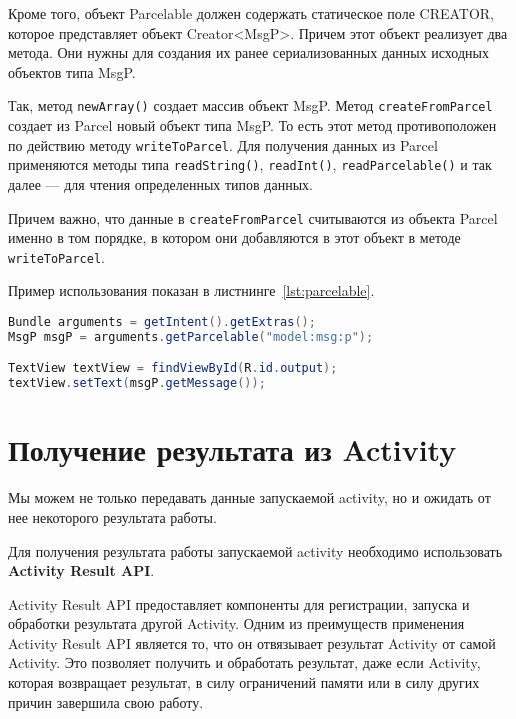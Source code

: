 Кроме того, объект Parcelable должен содержать статическое поле
CREATOR, которое представляет объект Creator<MsgP>. Причем этот объект
реализует два метода. Они нужны для создания их ранее сериализованных
данных исходных объектов типа MsgP.\par
Так, метод \texttt{newArray()} создает массив объект MsgP.
Метод \texttt{createFromParcel} создает из Parcel новый объект типа MsgP.
То есть этот метод противоположен по действию методу \texttt{writeToParcel}.
Для получения данных из Parcel применяются методы типа \texttt{readString()},
\texttt{readInt()}, \texttt{readParcelable()} и так далее --- для чтения
определенных типов данных.\par
Причем важно, что данные в \texttt{createFromParcel} считываются из объекта
Parcel именно в том порядке, в котором они добавляются в этот объект в методе
\texttt{writeToParcel}.\par
Пример использования показан в листнинге~\ref{lst:parcelable}.

\begin{lstlisting}[language=Java
	, caption=\leftline{}
	, label=lst:parcelable
	]
Bundle arguments = getIntent().getExtras();
MsgP msgP = arguments.getParcelable("model:msg:p");

TextView textView = findViewById(R.id.output);
textView.setText(msgP.getMessage());
\end{lstlisting}

\section{Получение результата из Activity}
Мы можем не только передавать данные запускаемой activity, но и ожидать
от нее некоторого результата работы.\par
Для получения результата работы запускаемой activity
необходимо использовать \textbf{Activity Result API}.\par
Activity Result API предоставляет компоненты для регистрации, запуска и
обработки результата другой Activity. Одним из преимуществ применения
Activity Result API является то, что он отвязывает результат Activity от самой
Activity. Это позволяет получить и обработать результат, даже если Activity,
которая возвращает результат, в силу ограничений памяти или в силу других
причин завершила свою работу.\par

